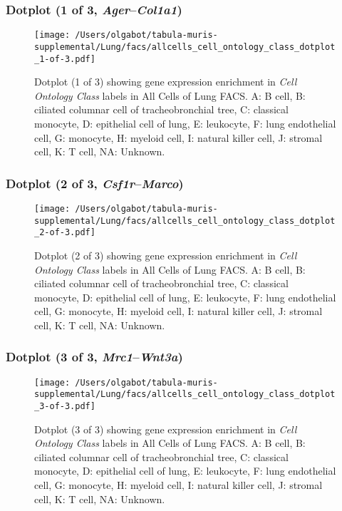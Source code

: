 \clearpage

\subsubsection{Dotplot (1 of 3, \emph{Ager}--\emph{Col1a1})}
\begin{figure}[h]
\centering
\texttt{[image: /Users/olgabot/tabula-muris-supplemental/Lung/facs/allcells\_cell\_ontology\_class\_dotplot\_1-of-3.pdf]}

\caption{ Dotplot (1 of 3)  showing gene expression enrichment in \emph{Cell Ontology Class} labels in All Cells of Lung FACS. A: B cell, B: ciliated columnar cell of tracheobronchial tree, C: classical monocyte, D: epithelial cell of lung, E: leukocyte, F: lung endothelial cell, G: monocyte, H: myeloid cell, I: natural killer cell, J: stromal cell, K: T cell, NA: Unknown.}
\end{figure}


\clearpage

\subsubsection{Dotplot (2 of 3, \emph{Csf1r}--\emph{Marco})}
\begin{figure}[h]
\centering
\texttt{[image: /Users/olgabot/tabula-muris-supplemental/Lung/facs/allcells\_cell\_ontology\_class\_dotplot\_2-of-3.pdf]}

\caption{ Dotplot (2 of 3)  showing gene expression enrichment in \emph{Cell Ontology Class} labels in All Cells of Lung FACS. A: B cell, B: ciliated columnar cell of tracheobronchial tree, C: classical monocyte, D: epithelial cell of lung, E: leukocyte, F: lung endothelial cell, G: monocyte, H: myeloid cell, I: natural killer cell, J: stromal cell, K: T cell, NA: Unknown.}
\end{figure}


\clearpage

\subsubsection{Dotplot (3 of 3, \emph{Mrc1}--\emph{Wnt3a})}
\begin{figure}[h]
\centering
\texttt{[image: /Users/olgabot/tabula-muris-supplemental/Lung/facs/allcells\_cell\_ontology\_class\_dotplot\_3-of-3.pdf]}

\caption{ Dotplot (3 of 3)  showing gene expression enrichment in \emph{Cell Ontology Class} labels in All Cells of Lung FACS. A: B cell, B: ciliated columnar cell of tracheobronchial tree, C: classical monocyte, D: epithelial cell of lung, E: leukocyte, F: lung endothelial cell, G: monocyte, H: myeloid cell, I: natural killer cell, J: stromal cell, K: T cell, NA: Unknown.}
\end{figure}


